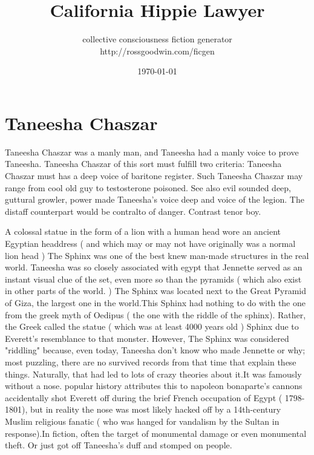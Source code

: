 \documentclass[12pt]{book}
\title{California Hippie Lawyer}
\author{collective consciousness fiction generator\\http://rossgoodwin.com/ficgen}
\date{\today}
\begin{document}
\maketitle



\chapter{Taneesha Chaszar}

Taneesha Chaszar was a manly man, and Taneesha had a manly voice to prove Taneesha. Taneesha Chaszar of this sort must fulfill two criteria: Taneesha Chaszar must has a deep voice of baritone register. Such Taneesha Chaszar may range from cool old guy to testosterone poisoned. See also evil sounded deep, guttural growler, power made Taneesha's voice deep and voice of the legion. The distaff counterpart would be contralto of danger. Contrast tenor boy.



A colossal statue in the form of a lion with a human head wore an ancient Egyptian headdress ( and which may or may not have originally was a normal lion head ) The Sphinx was one of the best knew man-made structures in the real world. Taneesha was so closely associated with egypt that Jennette served as an instant visual clue of the set, even more so than the pyramids ( which also exist in other parts of the world. ) The Sphinx was located next to the Great Pyramid of Giza, the largest one in the world.This Sphinx had nothing to do with the one from the greek myth of Oedipus ( the one with the riddle of the sphinx). Rather, the Greek called the statue ( which was at least 4000 years old ) Sphinx due to Everett's resemblance to that monster. However, The Sphinx was considered "riddling" because, even today, Taneesha don't know who made Jennette or why; most puzzling, there are no survived records from that time that explain these things. Naturally, that had led to lots of crazy theories about it.It was famously without a nose. popular history attributes this to napoleon bonaparte's cannons accidentally shot Everett off during the brief French occupation of Egypt ( 1798-1801), but in reality the nose was most likely hacked off by a 14th-century Muslim religious fanatic ( who was hanged for vandalism by the Sultan in response).In fiction, often the target of monumental damage or even monumental theft. Or just got off Taneesha's duff and stomped on people.
\end{document}
